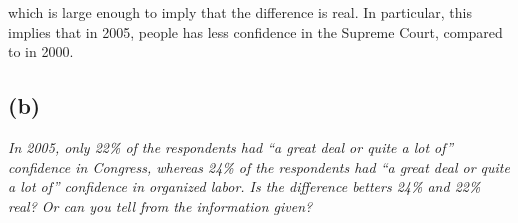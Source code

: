 \documentclass[11pt]{article}
\begin{document}
\noindent which is large enough to imply that the difference is real. In particular, this implies that in 2005, people has less confidence in the Supreme Court, compared to in 2000.


\subsection*{(b)}
\noindent \textit{ In 2005, only 22\% of the respondents had ``a great deal or quite a lot of'' confidence in Congress, whereas 24\% of the respondents had ``a great deal or quite a lot of'' confidence in organized labor. Is the difference betters 24\% and 22\% real? Or can you tell from the information given?}\\
 
%
%
%
\end{document}

